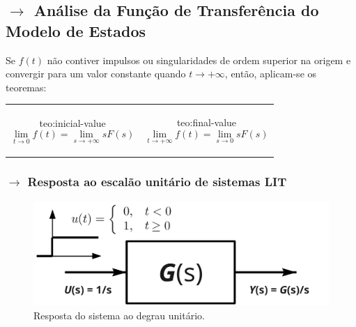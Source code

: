 \newpage
\subsection[1.2 Análise da Função de Transferência do Modelo de Estados]{$\rightarrow$ Análise da Função de Transferência do Modelo de Estados}
\label{subsec:model-analysis}


Se $f(t)$ não contiver impulsos ou singularidades de ordem superior na origem e convergir para um valor constante quando $t \to +\infty$, então, aplicam-se os teoremas:
\begin{center}%
    \begin{tabular}{c c}%
        \begin{minipage}{0.425\linewidth}%
            \begin{theo}[\underline{Teorema do Valor Incial}]{teo:inicial-value}\label{teo:inicial-value}
                $$
                    \lim_{t \to 0} f(t) = \lim_{s \to +\infty} sF(s)
                $$
            \end{theo}%
        \end{minipage}%
        &%
        \begin{minipage}{0.425\linewidth}%
            \begin{theo}[\underline{Teorema do Valor Final}]{teo:final-value}\label{teo:final-value}
                $$
                    \lim_{t \to +\infty} f(t) = \lim_{s \to 0} sF(s)
                $$
            \end{theo}%
        \end{minipage}%
    \end{tabular}%
\end{center}%

\subsubsection[1.2.2 Resposta ao escalão unitário de sistemas LIT]{$\pmb{\rightarrow}$ Resposta ao escalão unitário de sistemas LIT}

\begin{figure}[H]
    \centering
    \includegraphics[width = 0.5\linewidth]{img/state-space-models/unit-step-response.png}
    \caption{Resposta do sistema ao degrau unitário.}
    \label{fig:unit-step-response}
\end{figure}

